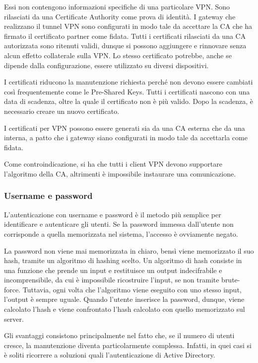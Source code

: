 Essi non contengono informazioni specifiche di una particolare VPN. Sono rilasciati da una Certificate Authority come prova di identità. I gateway che realizzano il tunnel VPN sono configurati in modo tale da accettare la CA che ha firmato il certificato partner come fidata. Tutti i certificati rilasciati da una CA autorizzata sono ritenuti validi, dunque si possono aggiungere e rinnovare senza alcun effetto collaterale sulla VPN. Lo stesso certificato potrebbe, anche se dipende dalla configurazione, essere utilizzato su diversi dispositivi.

I certificati riducono la manutenzione richiesta perché non devono essere cambiati così frequentemente come le Pre-Shared Keys. Tutti i certificati nascono con una data di scadenza, oltre la quale il certificato non è più valido. Dopo la scadenza, è necessario creare un nuovo certificato.

I certificati per VPN possono essere generati sia da una CA esterna che da una interna, a patto che i gateway siano configurati in modo tale da accettarla come fidata.

Come controindicazione, si ha che tutti i client VPN devono supportare l'algoritmo della CA, altrimenti è impossibile instaurare una comunicazione.


\subsubsection{Username e password}

L'autenticazione con username e password è il metodo più semplice per identificare e autenticare gli utenti. Se la password immessa dall'utente non corrisponde a quella memorizzata nel sistema, l'accesso è ovviamente negato.

La password non viene mai memorizzata in chiaro, bensì viene memorizzato il suo hash, tramite un algoritmo di hashing scelto. Un algoritmo di hash consiste in una funzione che prende un input e restituisce un output indecifrabile e incomprensibile, da cui è impossibile ricostruire l'input, se non tramite brute-force. Tuttavia, ogni volta che l'algoritmo viene eseguito con uno stesso input, l'output è sempre uguale.
Quando l'utente inserisce la password, dunque, viene calcolato l'hash e viene confrontato l'hash calcolato con quello memorizzato sul server.

Gli svantaggi consistono principalmente nel fatto che, se il numero di utenti cresce, la manutenzione diventa particolarmente complessa. Infatti, in quei casi si è soliti ricorrere a soluzioni quali l'autenticazione di Active Directory.

